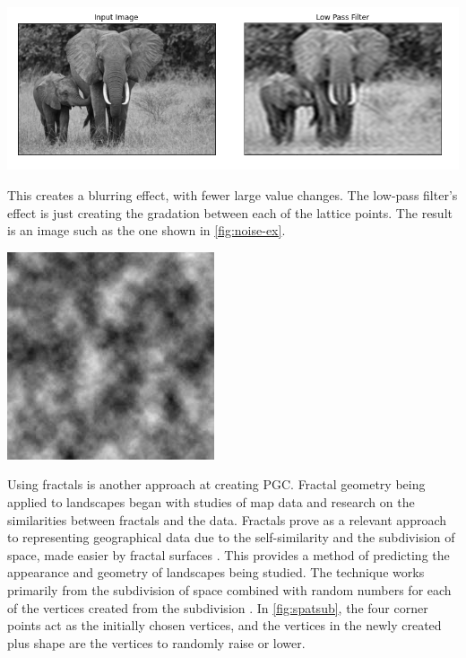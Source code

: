 \documentclass[10pt]{report}
\begin{document}
		\begin{minipage}{\textwidth}
			\centering
			\includegraphics[scale=0.5]{lowpass}
			\label{fig:lpf}
		\end{minipage}
		
		This creates a blurring effect, with fewer large value changes. The low-pass filter's effect is just creating the gradation between each of the lattice points. The result is an image such as the one shown in \autoref{fig:noise-ex}.
		
		\begin{minipage}{\textwidth}
			\centering
			\includegraphics[scale=1]{lect14-perlin}
			\label{fig:noise-ex}
		\end{minipage}

		Using fractals is another approach at creating PGC. Fractal geometry being applied to landscapes began with studies of map data and research on the similarities between fractals and the data. Fractals prove as a relevant approach to representing geographical data due to the self-similarity and the subdivision of space, made easier by fractal surfaces \cite{doi:10.1111/j.1467-8306.1987.tb00158.x}. This provides a method of predicting the appearance and geometry of landscapes being studied. The technique works primarily from the subdivision of space combined with random numbers for each of the vertices created from the subdivision \cite{fractal-land}. In \autoref{fig:spatsub}, the four corner points act as the initially chosen vertices, and the vertices in the newly created plus shape are the vertices to randomly raise or lower. 
		
\end{document}
